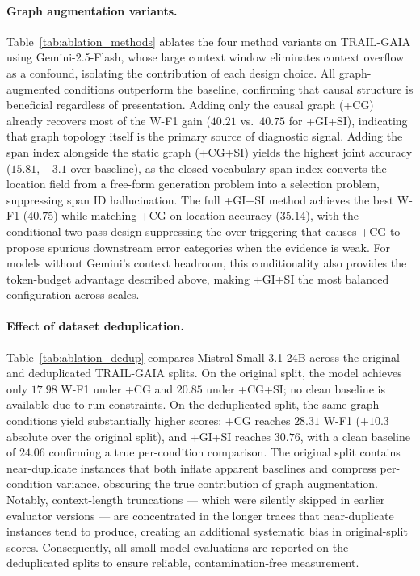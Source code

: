 \paragraph{Graph augmentation variants.}
Table~\ref{tab:ablation_methods} ablates the four method variants on TRAIL-GAIA using
Gemini-2.5-Flash, whose large context window eliminates context overflow as a
confound, isolating the contribution of each design choice.
All graph-augmented conditions outperform the baseline, confirming that causal
structure is beneficial regardless of presentation.
Adding only the causal graph (+CG) already recovers most of the W-F1 gain
($40.21$ vs.\ $40.75$ for +GI+SI), indicating that graph topology itself is the
primary source of diagnostic signal.
Adding the span index alongside the static graph (+CG+SI) yields the highest
joint accuracy ($15.81$, $+3.1$ over baseline), as the closed-vocabulary span index
converts the location field from a free-form generation problem into a
selection problem, suppressing span ID hallucination.
The full +GI+SI method achieves the best W-F1 ($40.75$) while matching +CG on
location accuracy ($35.14$), with the conditional two-pass design suppressing the
over-triggering that causes +CG to propose spurious downstream error categories
when the evidence is weak.
For models without Gemini's context headroom, this conditionality also provides
the token-budget advantage described above, making +GI+SI the most balanced
configuration across scales.

\paragraph{Effect of dataset deduplication.}
Table~\ref{tab:ablation_dedup} compares Mistral-Small-3.1-24B across the original and
deduplicated TRAIL-GAIA splits.
On the original split, the model achieves only $17.98$ W-F1 under +CG and $20.85$
under +CG+SI; no clean baseline is available due to run constraints.
On the deduplicated split, the same graph conditions yield substantially higher scores:
+CG reaches $28.31$ W-F1 ($+10.3$ absolute over the original split), and +GI+SI
reaches $30.76$, with a clean baseline of $24.06$ confirming a true per-condition
comparison.
The original split contains near-duplicate instances that both inflate apparent baselines
and compress per-condition variance, obscuring the true contribution of graph augmentation.
Notably, context-length truncations — which were silently skipped in earlier evaluator
versions — are concentrated in the longer traces that near-duplicate instances tend to
produce, creating an additional systematic bias in original-split scores.
Consequently, all small-model evaluations are reported on the deduplicated splits to
ensure reliable, contamination-free measurement.
